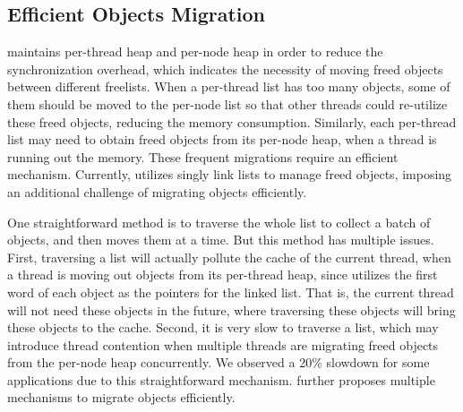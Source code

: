 \subsection{Efficient Objects Migration} 

\label{sec:moveobjects}

\NM{} maintains per-thread heap and per-node heap in order to reduce the synchronization overhead, which indicates the necessity of moving freed objects between different freelists. 
When a per-thread list has too many objects, some of them should be moved to the per-node list so that other threads could re-utilize these freed objects, reducing the memory consumption. Similarly, each per-thread list may need to obtain freed objects from its per-node heap, when a thread is running out the memory. These frequent migrations require an efficient mechanism. Currently, \NM{} utilizes singly link lists to manage freed objects, imposing an additional challenge of migrating objects efficiently. 

One straightforward method is to traverse the whole list to collect a batch of objects, and then moves them at a time. But this method has multiple issues.
First, traversing a list will actually pollute the cache of the current thread, when a thread is moving out objects from its per-thread heap, since \NM{} utilizes the first word of each object as the pointers for the linked list. That is, the current thread will not need these objects in the future, where traversing these objects will bring these objects to the cache. 
Second, it is very slow to traverse a list, which may introduce thread contention when multiple threads are migrating freed objects from the per-node heap concurrently. We observed a 20\% slowdown for some applications due to this straightforward mechanism. \NM{} further proposes multiple mechanisms to migrate objects efficiently. 

